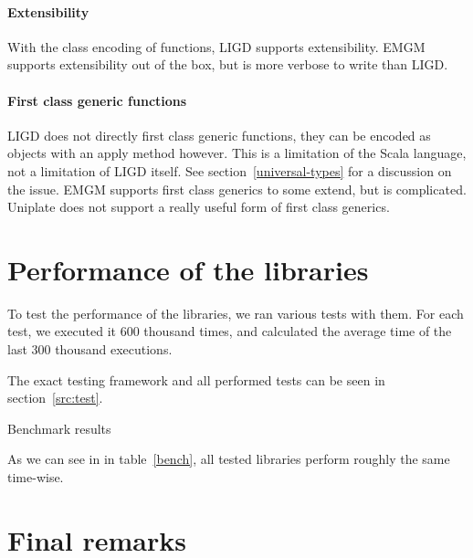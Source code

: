 \paragraph{Extensibility}
With the class encoding of functions, LIGD supports
extensibility. EMGM supports extensibility out of the box, but is more verbose
to write than LIGD. 

\paragraph{First class generic functions}
LIGD does not directly first class generic functions, they can be encoded as
objects with an apply method however. This is a limitation of the Scala
language, not a limitation of LIGD itself. See section~\ref{universal-types}
for a discussion on the issue. EMGM supports first class generics to some
extend, but is complicated. Uniplate does not support a really useful form
of first class generics. 

\section{Performance of the libraries}

To test the performance of the libraries, we ran various tests with them. For
each test, we executed it 600 thousand times, and calculated the average
time of the last 300 thousand executions.

The exact testing framework and all performed tests can be seen in
section~\ref{src:test}.

\begin{table}[ht]

\caption{Benchmark results}
\label{bench}
\end{table}

As we can see in in table~\ref{bench}, all tested libraries perform roughly
the same time-wise.

\section{Final remarks}
